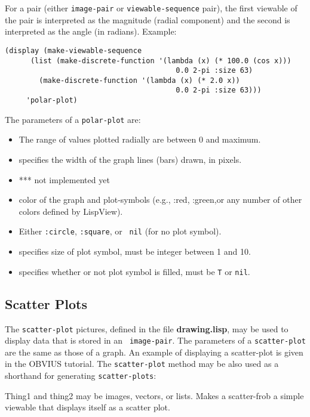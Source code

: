 For a pair (either {\tt image-pair} or {\tt viewable-sequence} pair),
the first viewable of the pair is interpreted as the magnitude (radial
component) and the second is interpreted as the angle (in radians).
Example: 
\begin{verbatim}
(display (make-viewable-sequence
	  (list (make-discrete-function '(lambda (x) (* 100.0 (cos x))) 
                                        0.0 2-pi :size 63)
		(make-discrete-function '(lambda (x) (* 2.0 x)) 
                                        0.0 2-pi :size 63)))
	 'polar-plot)
\end{verbatim}

The parameters of a {\tt polar-plot} are:
\begin{itemize}
\item {} The range of values plotted radially are between
0 and maximum.

\item {} specifies the width of the graph lines (bars)
drawn, in pixels.

\item {} *** not implemented yet

\item {} color of the graph and plot-symbols (e.g., :red,
:green,or any number of other colors defined by LispView).

\item {} Either {\tt :circle}, {\tt :square}, or {\tt
nil} (for no plot symbol).

\item {} specifies size of plot symbol, must be
integer between 1 and 10.

\item {} specifies whether or not plot symbol is
filled, must be {\tt T} or {\tt nil}.
\end{itemize}



\subsection{Scatter Plots}
\label{sec:scatter-plot}

The {\tt scatter-plot} pictures, defined in the file {\bf
drawing.lisp}, may be used to display data that is stored in an {\tt
image-pair}.  The parameters of a {\tt scatter-plot} are the same as
those of a graph.  An example of displaying a scatter-plot is given in
the OBVIUS tutorial.  The {\tt scatter-plot} method may be also used
as a shorthand for generating {\tt scatter-plots}:
\begin{description}
\item{}
Thing1 and thing2 may be images, vectors, or lists.  Makes a
scatter-frob a simple viewable that displays itself as a scatter plot.
\end{description}


